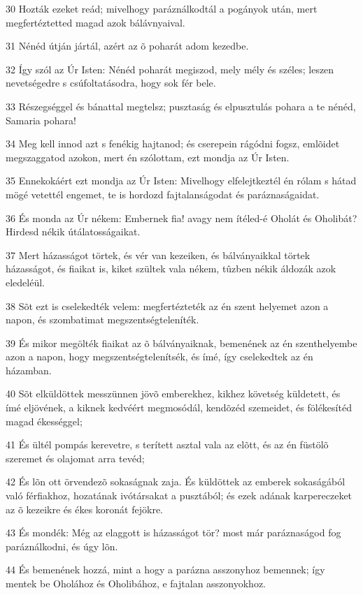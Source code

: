 \par 30 Hozták ezeket reád; mivelhogy paráználkodtál a pogányok után, mert megfertéztetted magad azok bálávnyaival.
\par 31 Nénéd útján jártál, azért az õ poharát adom kezedbe.
\par 32 Így szól az Úr Isten: Nénéd poharát megiszod, mely mély és széles; leszen nevetségedre s csúfoltatásodra, hogy sok fér bele.
\par 33 Részegséggel és bánattal megtelsz; pusztaság és elpusztulás pohara a te nénéd, Samaria pohara!
\par 34 Meg kell innod azt s fenékig hajtanod; és cserepein rágódni fogsz, emlõidet megszaggatod azokon, mert én szólottam, ezt mondja az Úr Isten.
\par 35 Ennekokáért ezt mondja az Úr Isten: Mivelhogy elfelejtkeztél én rólam s hátad mögé vetettél engemet, te is hordozd fajtalanságodat és paráznaságaidat.
\par 36 És monda az Úr nékem: Embernek fia! avagy nem ítéled-é Oholát és Oholibát? Hirdesd nékik útálatosságaikat.
\par 37 Mert házasságot törtek, és vér van kezeiken, és bálványaikkal törtek házasságot, és fiaikat is, kiket szültek vala nékem, tûzben nékik áldozák azok eledeléül.
\par 38 Sõt ezt is cselekedték velem: megfertézteték az én szent helyemet azon a napon, és szombatimat megszentségteleníték.
\par 39 És mikor megölték fiaikat az õ bálványaiknak, bemenének az én szenthelyembe azon a napon, hogy megszentségtelenítsék, és ímé, így cselekedtek az én házamban.
\par 40 Sõt elküldöttek messzünnen jövõ emberekhez, kikhez követség küldetett, és ímé eljövének, a kiknek kedvéért megmosódál, kendõzéd szemeidet, és fölékesítéd magad ékességgel;
\par 41 És ültél pompás kerevetre, s terített asztal vala az elõtt, és az én füstölõ szeremet és olajomat arra tevéd;
\par 42 És lõn ott örvendezõ sokaságnak zaja. És küldöttek az emberek sokaságából való férfiakhoz, hozatának ivótársakat a pusztából; és ezek adának karpereczeket az õ kezeikre és ékes koronát fejökre.
\par 43 És mondék: Még az elaggott is házasságot tör? most már paráznaságod fog paráználkodni, és úgy lõn.
\par 44 És bemenének hozzá, mint a hogy a parázna asszonyhoz bemennek; így mentek be Oholához és Oholibához, e fajtalan asszonyokhoz.
